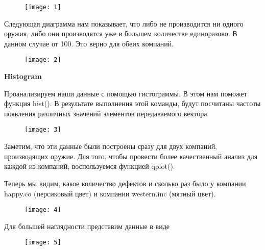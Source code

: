 \documentclass{beamer}
\begin{document}
\begin{frame}
\begin{figure}[t]
	\centering
	\texttt{[image: 1]}
\end{figure}
\end{frame}

\begin{frame}
Следующая диаграмма нам показывает, что либо не производится ни одного оружия, либо они производятся уже в большем количестве единоразово. В данном случае от 100. Это верно для обеих компаний.
\begin{figure}[t]
	\centering
	\texttt{[image: 2]}
\end{figure}

\end{frame}

\begin{frame}
\textbf{Histogram}

Проанализируем наши данные с помощью гистограммы. В этом нам поможет функция hist(). В результате выполнения этой команды, будут посчитаны частоты появления различных значений элементов передаваемого вектора.
\begin{figure}[t]
\centering
\texttt{[image: 3]}
\end{figure}
\end{frame}

\begin{frame}
Заметим, что эти данные были построены сразу для двух компаний, производящих оружие. Для того, чтобы провести более качественный анализ для каждой из компаний, воспользуемся функцией qplot().

Теперь мы видим, какое количество дефектов и сколько раз было у компании happy.co (персиковый цвет) и компании western.inc (мятный цвет).
\begin{figure}[t]
\centering
\texttt{[image: 4]}
\end{figure}
\end{frame}

\begin{frame}
Для большей наглядности представим данные в виде
\begin{figure}[t]
\centering
\texttt{[image: 5]}
\end{figure}
\end{frame}
\end{document}
